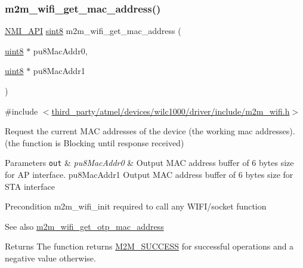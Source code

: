 \subsubsection{\texorpdfstring{m2m\+\_\+wifi\+\_\+get\+\_\+mac\+\_\+address()}{m2m\_wifi\_get\_mac\_address()}}
{\footnotesize\ttfamily \hyperlink{group__BSPDefine_gaecc0323d771e41ef81a76b5f12783e22}{N\+M\+I\+\_\+\+A\+PI} \hyperlink{group__DataT_gae35f10ffd0ac8dd2bc3e794da9bdfbc7}{sint8} m2m\+\_\+wifi\+\_\+get\+\_\+mac\+\_\+address (\begin{DoxyParamCaption}\item[{\hyperlink{group__DataT_ga4df709a77647e870bbf1d955b8edc9a6}{uint8} $\ast$}]{pu8\+Mac\+Addr0,  }\item[{\hyperlink{group__DataT_ga4df709a77647e870bbf1d955b8edc9a6}{uint8} $\ast$}]{pu8\+Mac\+Addr1 }\end{DoxyParamCaption})}



{\ttfamily \#include $<$\hyperlink{m2m__wifi_8h}{third\+\_\+party/atmel/devices/wilc1000/driver/include/m2m\+\_\+wifi.\+h}$>$}



Request the current M\+AC addresses of the device (the working mac addresses). (the function is Blocking until response received) 


\begin{DoxyParams}[1]{Parameters}
\mbox{\tt out}  & {\em pu8\+Mac\+Addr0} & Output M\+AC address buffer of 6 bytes size for AP interface. pu8\+Mac\+Addr1 Output M\+AC address buffer of 6 bytes size for S\+TA interface \\
\hline
\end{DoxyParams}
\begin{DoxyPrecond}{Precondition}
m2m\+\_\+wifi\+\_\+init required to call any W\+I\+F\+I/socket function 
\end{DoxyPrecond}
\begin{DoxySeeAlso}{See also}
\hyperlink{group__WifiGetOtpMacAddFn_gadb7460d1e0b162decddb7b520e6dbf7b}{m2m\+\_\+wifi\+\_\+get\+\_\+otp\+\_\+mac\+\_\+address} 
\end{DoxySeeAlso}
\begin{DoxyReturn}{Returns}
The function returns \hyperlink{nm__common_8h_a9ef27ba27aafdd1aa3a79d3ba2c36b8f}{M2\+M\+\_\+\+S\+U\+C\+C\+E\+SS} for successful operations and a negative value otherwise.
\end{DoxyReturn}

